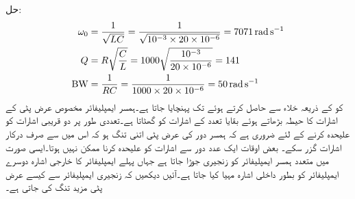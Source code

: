 حل:
\begin{align*}
\omega_0&=\frac{1}{\sqrt{LC}}=\frac{1}{\sqrt{10^{-3}\times 20 \times 10^{-6}}}=\SI{7071}{\radian\per\second}\\
Q&=R\sqrt{\frac{C}{L}}=1000\sqrt{\frac{10^{-3}}{20\times 10^{-6}}}=141\\
{{\textup{BW}}}&=\frac{1}{RC}=\frac{1}{1000\times 20\times 10^{-6}}=\SI{50}{\radian\per\second}
\end{align*}
 کو  کے ذریعہ خلاء سے حاصل کرتے ہوئے  تک پہنچایا جاتا ہے۔ہمسر ایمپلیفائر مخصوص  عرض پٹی کے اشارات کا حیطہ بڑھاتے ہوئے بقایا تعدد کے اشارات کو گھٹاتا ہے۔تعددی طور پر دو قریبی اشارات کو علیحدہ کرنے کے لئے ضروری ہے کہ ہمسر دور کی عرض پٹی اتنی تنگ ہو کہ اس میں سے صرف درکار اشارات گزر سکے۔ بعض اوقات ایک عدد  دور سے اشارات کو علیحدہ کرنا ممکن نہیں ہوتا۔ایسی صورت میں متعدد ہمسر ایمپلیفائر کو زنجیری جوڑا جاتا ہے جہاں پہلے ایمپلیفائر کا خارجی اشارہ دوسرے ایمپلیفائر کو بطور داخلی اشارہ مہیا کیا جاتا ہے۔آئیں دیکھیں کہ زنجیری ایمپلیفائر سے کیسے عرض پٹی مزید تنگ کی جاتی ہے۔

